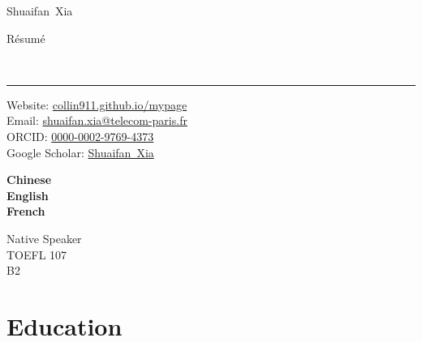 \documentclass[9pt,a4paper]{article}
\makeatletter
\newcommand{\Title}{Résumé}
\newcommand{\FirstName}{Shuaifan}
\newcommand{\LastName}{Xia}
\newcommand{\MyName}{\FirstName\ \LastName}
\newcommand{\Email}{shuaifan.xia@telecom-paris.fr}
\newcommand{\PersonalWebsite}{collin911.github.io/mypage}
\newcommand{\ORCID}{0000-0002-9769-4373}
\newcommand{\Website}[1]{\href{https://#1}{#1}}
\makeatother
\begin{document}
\begin{minipage}[t]{0.5\textwidth}
  {\fontsize{20pt}{0}\selectfont\MyName}
\end{minipage}
\begin{minipage}[t]{0.5\textwidth}
  \begin{flushright}
    \Title{}
  \end{flushright}
\end{minipage}
\\[-0.1cm]
\textcolor{lightgray}{\rule{\textwidth}{3pt}}
\begin{minipage}[t]{0.75\textwidth}
  Website: \Website{\PersonalWebsite}
  \\
  Email: \href{mailto:\Email}{\Email}
  \\
  ORCID: \href{https://orcid.org/\ORCID}{\ORCID}
  \\
  Google Scholar: \href{https://scholar.google.com/citations?user=x4Y8uCAAAAAJ}{\MyName}
\end{minipage}
\begin{minipage}[t]{0.07\textwidth}
    \textbf{Chinese} 
    \\
    \textbf{English} 
    \\
    \textbf{French} 
    \\
\end{minipage}
\begin{minipage}[t]{0.18\textwidth}
  \begin{flushright}
    Native Speaker
    \\
    TOEFL 107
    \\
    B2
    \\
  \end{flushright}
\end{minipage}


\section{Education}
\end{document}
